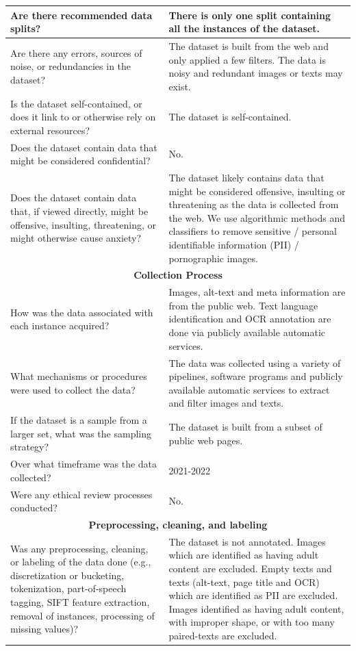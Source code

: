 \begin{longtable}[c]{ p{} | p{} }
Are there recommended data splits? & There is only one split containing all the instances of the dataset. \\ \midrule
Are there any errors, sources of noise, or redundancies in the dataset? & The dataset is built from the web and only applied a few filters. The data is noisy and redundant images or texts may exist. \\ \midrule
Is the dataset self-contained, or does it link to or otherwise rely on external resources? & The dataset is self-contained. \\ \midrule
Does the dataset contain data that might be considered confidential? & No. \\ \midrule
Does the dataset contain data that, if viewed directly, might be offensive, insulting, threatening, or might otherwise cause anxiety? & The dataset likely contains data that might be considered offensive, insulting or threatening as the data is collected from the web. We use algorithmic methods and classifiers to remove sensitive / personal identifiable information (PII) / pornographic images. \\
\toprule
\multicolumn{2}{c}{\textbf{Collection Process}}      \\ \toprule
How was the data associated with each instance acquired? & Images, alt-text and meta information are from the public web. Text language identification and OCR annotation are done via publicly available automatic services. \\ \midrule
What mechanisms or procedures were used to collect the data? & The data was collected using a variety of pipelines, software programs and publicly available automatic services to extract and filter images and texts. \\ \midrule
If the dataset is a sample from a larger set, what was the sampling strategy? & The dataset is built from a subset of public web pages.  \\ \midrule
Over what timeframe was the data collected? & 2021-2022 \\ \midrule
Were any ethical review processes conducted? & No. \\ \toprule
\multicolumn{2}{c}{\textbf{Preprocessing, cleaning, and labeling}}      \\ \toprule
Was any preprocessing, cleaning, or labeling of the data done (e.g., discretization or bucketing, tokenization, part-of-speech tagging, SIFT feature extraction, removal of instances, processing of missing values)? & The dataset is not annotated. Images which are identified as having adult content are excluded. Empty texts and texts (alt-text, page title and OCR) which are identified as PII are excluded. Images identified as having adult content, with improper shape, or with too many paired-texts are excluded. \\ \midrule

\end{longtable}
